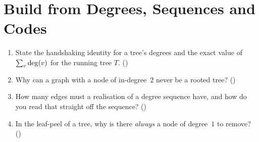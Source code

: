 \section{Build from Degrees, Sequences and Codes}\label{sec:c25-degree}

\begin{previouslybox}
\begin{enumerate}[nosep, leftmargin=1.6em]
  \item State the handshaking identity for a tree's degrees and the exact value of
        $\sum_v\operatorname{deg}(v)$ for the running tree $T$. ()
  \item Why can a graph with a node of in-degree~$2$ never be a rooted tree?
        ()
  \item How many edges must a realisation of a degree sequence have, and how do you
        read that straight off the sequence? ()
  \item In the leaf-peel of a tree, why is there \emph{always} a node of degree~$1$ to remove?
        ()
\end{enumerate}
\end{previouslybox}

